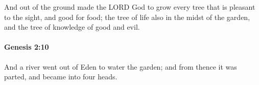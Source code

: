 			And out of the ground made the LORD God to grow every tree that is pleasant to the sight, and good for food; the tree of life also in the midst of the garden, and the tree of knowledge of good and evil.


		\paragraph{Genesis 2:10} %
			\label{GENESIS-2-10}

			And a river went out of Eden to water the garden; and from thence it was parted, and became into four heads.


